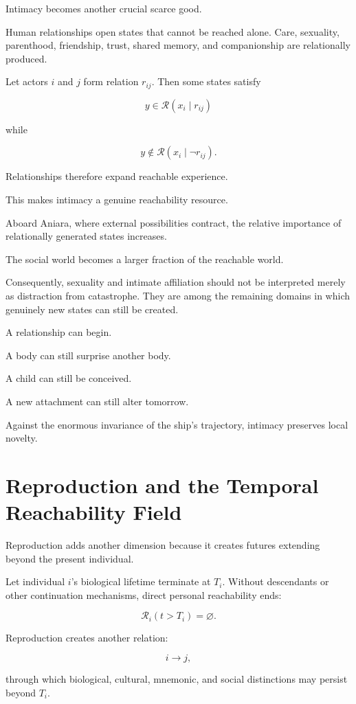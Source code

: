 \documentclass[11pt,oneside]{book}
\theoremstyle{definition}
\theoremstyle{remark}
\newcommand{\R}{\mathcal{R}}
\begin{document}
Intimacy becomes another crucial scarce good.

Human relationships open states that cannot be reached alone. Care, sexuality, parenthood, friendship, trust, shared memory, and companionship are relationally produced.

Let actors \(i\) and \(j\) form relation \(r_{ij}\). Then some states satisfy

\[
y\in\R(x_i\mid r_{ij})
\]

while

\[
y\notin\R(x_i\mid\neg r_{ij}).
\]

Relationships therefore expand reachable experience.

This makes intimacy a genuine reachability resource.

Aboard Aniara, where external possibilities contract, the relative importance of relationally generated states increases.

The social world becomes a larger fraction of the reachable world.

Consequently, sexuality and intimate affiliation should not be interpreted merely as distraction from catastrophe. They are among the remaining domains in which genuinely new states can still be created.

A relationship can begin.

A body can still surprise another body.

A child can still be conceived.

A new attachment can still alter tomorrow.

Against the enormous invariance of the ship's trajectory, intimacy preserves local novelty.

\section{Reproduction and the Temporal Reachability Field}

Reproduction adds another dimension because it creates futures extending beyond the present individual.

Let individual \(i\)'s biological lifetime terminate at \(T_i\). Without descendants or other continuation mechanisms, direct personal reachability ends:

\[
\R_i(t>T_i)=\varnothing.
\]

Reproduction creates another relation:

\[
i\rightarrow j,
\]

through which biological, cultural, mnemonic, and social distinctions may persist beyond \(T_i\).
\end{document}

